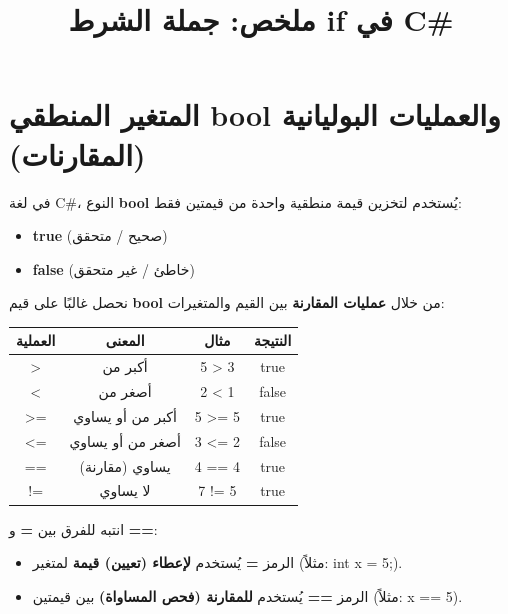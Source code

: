 \documentclass[14pt]{extarticle}
\title{ملخص: جملة الشرط \textenglish{if} في \textenglish{C\#}}
\begin{document}
\maketitle
\thispagestyle{fancy}

\section{المتغير المنطقي \textenglish{bool} والعمليات البوليانية (المقارنات)}

في لغة \textenglish{C\#}، النوع \textbf{\textenglish{bool}} يُستخدم لتخزين قيمة منطقية واحدة من قيمتين فقط:
\begin{itemize}
    \item \textbf{\textenglish{true}} (صحيح / متحقق)
    \item \textbf{\textenglish{false}} (خاطئ / غير متحقق)
\end{itemize}

نحصل غالبًا على قيم \textbf{\textenglish{bool}} من خلال \textbf{عمليات المقارنة} بين القيم والمتغيرات:

\begin{center}
\begin{tabular}{|c|c|c|c|}
\hline
\textbf{العملية} & \textbf{المعنى} & \textbf{مثال} & \textbf{النتيجة} \\
\hline
\textenglish{>} & أكبر من & \textenglish{5 > 3} & \textenglish{true} \\
\hline
\textenglish{<} & أصغر من & \textenglish{2 < 1} & \textenglish{false} \\
\hline
\textenglish{>=} & أكبر من أو يساوي & \textenglish{5 >= 5} & \textenglish{true} \\
\hline
\textenglish{<=} & أصغر من أو يساوي & \textenglish{3 <= 2} & \textenglish{false} \\
\hline
\textenglish{==} & يساوي (مقارنة) & \textenglish{4 == 4} & \textenglish{true} \\
\hline
\textenglish{!=} & لا يساوي & \textenglish{7 != 5} & \textenglish{true} \\
\hline
\end{tabular}
\end{center}

\begin{boxWarning}
انتبه للفرق بين \textbf{\textenglish{=}} و \textbf{\textenglish{==}}:
\begin{itemize}
    \item الرمز \textbf{\textenglish{=}} يُستخدم \textbf{لإعطاء (تعيين) قيمة} لمتغير (مثلاً: \textenglish{int x = 5;}).
    \item الرمز \textbf{\textenglish{==}} يُستخدم \textbf{للمقارنة (فحص المساواة)} بين قيمتين (مثلاً: \textenglish{x == 5}).
\end{itemize}
\end{boxWarning}
\end{document}
